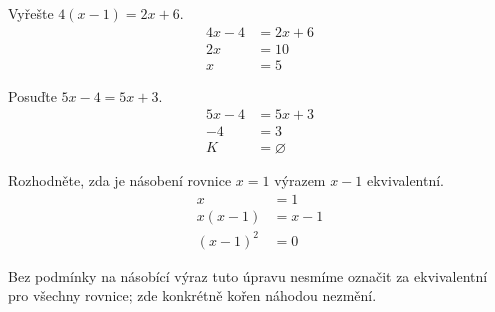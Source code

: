 \documentclass[11pt,a4paper]{article}
\begin{document}
\begin{zadaniReseniBox}[title={Samostatná práce 2}]
Vyřešte $4(x-1)=2x+6$.
\tcblower
\begin{align*}
4x-4 &= 2x+6 \\
 2x &= 10 \\
 x &= 5
\end{align*}
\end{zadaniReseniBox}
\begin{zadaniReseniBox}[title={Samostatná práce 3}]
Posuďte $5x-4=5x+3$.
\tcblower
\begin{align*}
5x-4 &=5x+3 \\
 -4 &=3 \\
 K&=\varnothing
\end{align*}
\end{zadaniReseniBox}
\begin{zadaniReseniBox}[title={Samostatná práce 4}]
Rozhodněte, zda je násobení rovnice $x=1$ výrazem $x-1$ ekvivalentní.
\tcblower
\begin{align*}
x &= 1 \\
 x(x-1) &= x-1 \\
 (x-1)^2 &=0
\end{align*}

Bez podmínky na násobící výraz tuto úpravu nesmíme označit za ekvivalentní pro všechny rovnice; zde konkrétně kořen náhodou nezmění.
\end{zadaniReseniBox}
\end{document}
